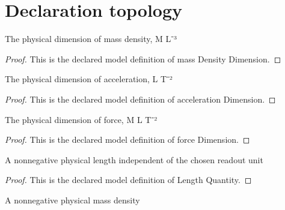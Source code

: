 \section{Declaration topology}
\begin{definition}
  \label{def:physics:phyx-mini-0392:phyxminiproblems-problemphyxmini0392-massdensitydimension}
  The physical dimension of mass density, M L⁻³
\end{definition}
\begin{proof}
  This is the declared model definition of mass Density Dimension.
\end{proof}
\begin{definition}
  \label{def:physics:phyx-mini-0392:phyxminiproblems-problemphyxmini0392-accelerationdimension}
  The physical dimension of acceleration, L T⁻²
\end{definition}
\begin{proof}
  This is the declared model definition of acceleration Dimension.
\end{proof}
\begin{definition}
  \label{def:physics:phyx-mini-0392:phyxminiproblems-problemphyxmini0392-forcedimension}
  The physical dimension of force, M L T⁻²
\end{definition}
\begin{proof}
  This is the declared model definition of force Dimension.
\end{proof}
\begin{definition}
  \label{def:physics:phyx-mini-0392:phyxminiproblems-problemphyxmini0392-lengthquantity}
  A nonnegative physical length independent of the chosen readout unit
\end{definition}
\begin{proof}
  This is the declared model definition of Length Quantity.
\end{proof}
\begin{definition}
  \label{def:physics:phyx-mini-0392:phyxminiproblems-problemphyxmini0392-massdensityquantity}
  A nonnegative physical mass density
\end{definition}
